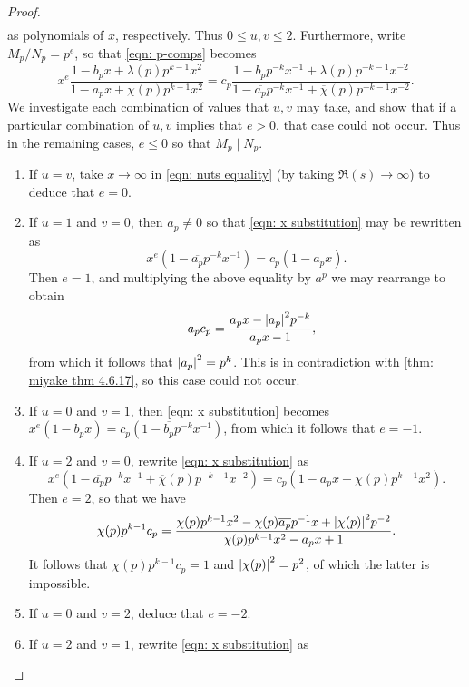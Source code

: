 \documentclass[10pt,leqno,twoside]{article}
\theoremstyle{plain}
\theoremstyle{definition}
\numberwithin{equation}{section}
\numberwithin{lem}{section}
\begin{document}
\begin{proof}
\begin{align*}
    \end{align*} as polynomials of $x$, respectively. Thus $0\leq u,v\leq 2$. Furthermore, write $M_p/N_p = p^e$, so that \cref{eqn: p-comps} becomes \begin{equation}\label{eqn: x substitution}
        x^e\frac{1-b_px + \lambda(p)p^{k-1}x^2}{1-a_px + \chi(p)p^{k-1}x^2} = c_p\frac{1-\overline{b_p}p^{-k}x^{-1} + \overline{\lambda}(p)p^{-k-1}x^{-2}}{1-\overline{a_p}p^{-k}x^{-1} + \overline{\chi}(p)p^{-k-1}x^{-2}}.
    \end{equation} We investigate each combination of values that $u,v$ may take, and show that if a particular combination of $u,v$ implies that $e>0$, that case could not occur. Thus in the remaining cases, $e\leq 0$ so that $M_p\mid N_p$.
    \begin{enumerate}[label=(\arabic*)]
        \item If $u = v$, take $x\to \infty$ in \cref{eqn: nuts equality} (by taking $\Re(s)\to\infty$) to deduce that $e= 0$.
        \item If $u = 1$ and $v = 0$, then $a_p\neq 0$ so that \cref{eqn: x substitution} may be rewritten as 
        \[x^e(1-\overline{a_p}p^{-k}x^{-1})=c_p(1-a_px).\] Then $e = 1$, and multiplying the above equality by $a^p$ we may rearrange to obtain 
        \[-a_pc_p = \frac{a_px-\abs{a_p}^2p^{-k}}{a_px-1},\] from which it follows that $\abs{a_p}^2 = p^k$. This is in contradiction with \cref{thm: miyake thm 4.6.17}, so this case could not occur.
        \item If $u = 0$ and $v = 1$, then \cref{eqn: x substitution} becomes $x^e(1-b_px) = c_p(1-\overline{b_p}p^{-k}x^{-1})$, from which it follows that $e = -1$.
        \item If $u = 2$ and $v = 0$, rewrite \cref{eqn: x substitution} as 
        \begin{equation}\label{eqn: nuts equality}
            x^e(1-\overline{a_p}p^{-k}x^{-1} + \overline{\chi}(p)p^{-k-1}x^{-2})=c_p(1-a_px + \chi(p)p^{k-1}x^2).
        \end{equation} Then $e=2$, so that we have 
        \[\chi(p)p^{k-1}c_p = \frac{\chi(p)p^{k-1}x^2-\chi(p)\overline{a_p}p^{-1}x + \abs{\chi(p)}^2p^{-2}}{\chi(p)p^{k-1}x^2-a_px+1}.\] It follows that $\chi(p)p^{k-1}c_p = 1$ and $\abs{\chi(p)}^2 = p^{2}$, of which the latter is impossible.
        \item If $u = 0$ and $v = 2$, deduce that $e = -2$.
        \item If $u = 2$ and $v = 1$, rewrite \cref{eqn: x substitution} as 

\end{enumerate}
\end{proof}
\end{document}
